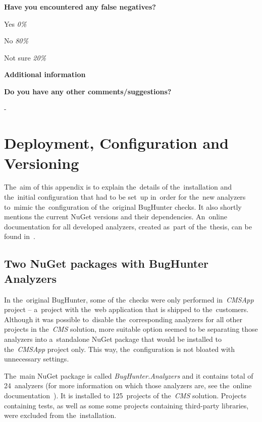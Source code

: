 \documentclass[
  digital, %
  table,   %
  lof,     %
  lot,     %
  oneside,
]{fithesis3}
\begin{document}
\smallskip\noindent
\textbf{Have you encountered any false negatives?}
\begin{compactitem}
\item Yes \textit{0\%}
\item No \textit{80\%}
\item Not sure \textit{20\%}
\end{compactitem}

\begin{center}
\textbf{Additional information}
\end{center}

\smallskip\noindent
\textbf{Do you have any other comments/suggestions?}

-

\chapter{Deployment, Configuration and Versioning}
\label{appendix:deployment}
The~aim of this appendix is to explain the~details of the~installation and the~initial configuration that had to be set~up in~order for the~new analyzers to~mimic the~configuration of the~original BugHunter checks. It also shortly mentions the current NuGet versions and their dependencies. An~online documentation for all developed analyzers, created as~part of the~thesis, can be found in~\cite{online-documentation}.

\section{Two NuGet packages with BugHunter Analyzers}
In the~original BugHunter, some of the~checks were only performed in~\textit{CMSApp} project -- a~project with the~web application that is shipped to the~customers. Although it was possible to~disable the~corresponding analyzers for all other projects in the~\textit{CMS} solution, more suitable option seemed to be separating those analyzers into a~standalone NuGet package that would be installed to the~\textit{CMSApp} project only. This way, the~configuration is not bloated with unnecessary settings.

The~main NuGet package is called \textit{BugHunter.Analyzers} and it contains total of 24~analyzers (for more information on which those analyzers are, see the~online documentation~\cite{online-documentation}). It is installed to 125~projects of the~\textit{CMS} solution. Projects containing tests, as well as some some projects containing third-party libraries, were excluded from the~installation.
\end{document}
